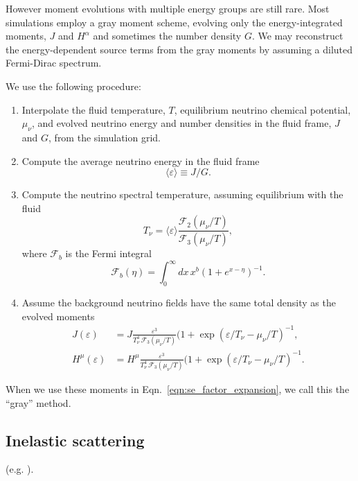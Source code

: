 \documentclass[aps,floatfix,prd,superscriptaddress,twocolumn]{revtex4-1}
\begin{document}
However moment evolutions with multiple energy groups are still rare.
Most simulations employ a gray moment scheme,
evolving only the energy-integrated moments, $J$ and $H^\alpha$
and sometimes the number density $G$.
We may reconstruct the energy-dependent source terms
from the gray moments by assuming a diluted Fermi-Dirac spectrum.

We use the following procedure:
\begin{enumerate}
\item
  Interpolate the fluid temperature, $T$,
  equilibrium neutrino chemical potential, $\mu_\nu$,
  and evolved neutrino energy and number densities in the fluid frame,
  $J$ and $G$, from the simulation grid.
\item
  Compute the average neutrino energy in the fluid frame
  \begin{equation}
    \langle \varepsilon \rangle \equiv J/G.
  \end{equation}
\item
  Compute the neutrino spectral temperature, assuming equilibrium with the
  fluid
  \begin{equation}
    T_\nu = \langle \varepsilon \rangle
    \frac{\mathscr{F}_2(\mu_\nu/T)}{\mathscr{F}_3(\mu_\nu/T)},
  \end{equation}
  where $\mathscr{F}_b$ is the Fermi integral
  \begin{equation}
    \mathscr{F}_b(\eta) = \int_0^\infty dx \, x^b (1+e^{x-\eta})^{-1}.
  \end{equation}
\item
  Assume the background neutrino fields have the same total density
  as the evolved moments
  \begin{align}
    \label{eqn:J_from_gray}
    J(\varepsilon) &=
    J \frac{\varepsilon^3}{T_\nu^4 \,\mathscr{F}_3(\mu_\nu/T)}
    (1+\exp(\varepsilon/T_\nu-\mu_\nu/T)^{-1}, \\
    \label{eqn:H_from_gray}
    H^\mu(\varepsilon) &=
    H^\mu \frac{\varepsilon^3}{T_\nu^4\, \mathscr{F}_3(\mu_\nu/T)}
    (1+\exp(\varepsilon/T_\nu-\mu_\nu/T)^{-1}.
  \end{align}
\end{enumerate}
When we use these moments in Eqn.~\ref{eqn:se_factor_expansion},
we call this the ``gray'' method.

\subsection{Inelastic scattering}
\label{ssec:sources_si}
(e.g. \cite[Eqn.~A6]{brue1985-core_collapse}).
\end{document}
